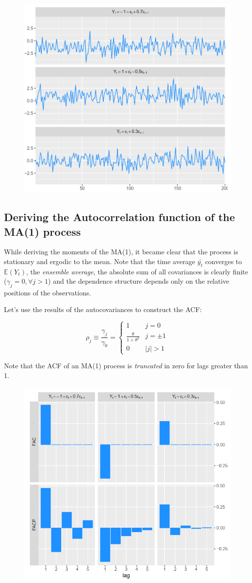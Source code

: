 \documentclass[11pt, a4paper]{report}
\theoremstyle{plain}
\theoremstyle{plain}
\theoremstyle{remark}
\begin{document}
\begin{figure}[h!]
	\centering
	\includegraphics[width=0.6\linewidth]{ma1}
	\label{fig:ma1}
\end{figure}

\subsection{Deriving the Autocorrelation function of the MA(1) process}

While deriving the moments of the MA(1), it became clear that the process is stationary and ergodic to the mean. Note that the time average $\bar{y_t}$ converges to $\mathbb{E}(Y_t)$, the \textit{ensemble average}, the absolute sum of all covariances is clearly finite ($\gamma_j = 0, \forall j > 1$) and the dependence structure depends only on the relative positions of the observations.

Let's use the results of the autocovariances to construct the ACF:

$$\rho_{j} \equiv \frac{\gamma_{j}}{\gamma_{0}}=\left\{\begin{array}{ll}
	1 & j=0 \\
	\frac{\theta}{1+\theta^{2}} & j=\pm 1 \\
	0 & |j|>1
\end{array}\right.$$

Note that the ACF of an MA(1) process is \textit{truncated} in zero for lags greater than 1.

\begin{figure}[h!]
	\centering
	\includegraphics[width=0.6\linewidth]{"fac facp"}
	\label{fig:fac-facp}
\end{figure}
\end{document}

